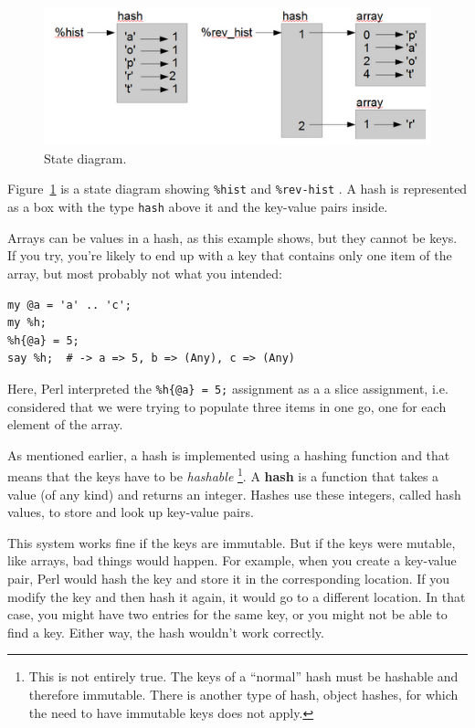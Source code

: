 \begin{figure}
\centerline
{\includegraphics[scale=0.8]{figs/hash1.png}}
\caption{State diagram.}
\label{fig.hash1}
\end{figure}

Figure~\ref{fig.hash1} is a state diagram showing \verb'%hist'  and \verb'%rev-hist' .
A hash is represented as a box with the type {\tt hash} above it
and the key-value pairs inside.

Arrays can be values in a hash, as this example shows, but they
cannot be keys.  If you try, you're likely to end up with a 
key that contains only one item of the array, but most probably 
not what you intended:

\begin{verbatim}
my @a = 'a' .. 'c';
my %h;
%h{@a} = 5;
say %h;  # -> a => 5, b => (Any), c => (Any)
\end{verbatim}

Here, Perl interpreted the \verb'%h{@a} = 5;' assignment 
as a a slice assignment, i.e. considered that we were 
trying to populate three items in one go, one for each 
element of the array.

As mentioned earlier, a hash is implemented using
a hashing function and that means that the keys have to 
be \emph{hashable} \footnote{This is not entirely true. The 
keys of a ``normal'' hash must be hashable and therefore 
immutable. There is another type of hash, object hashes, 
for which the need to have immutable keys does not apply.}. 
A {\bf hash} is a function that takes 
a value (of any kind) and returns an integer.  Hashes use 
these integers, called hash values, to store and look up 
key-value pairs.

This system works fine if the keys are immutable.  But if the
keys were mutable, like arrays, bad things would happen. For example,
when you create a key-value pair, Perl would hash the key and 
store it in the corresponding location.  If you modify the
key and then hash it again, it would go to a different location.
In that case, you might have two entries for the same key,
or you might not be able to find a key.  Either way, the
hash wouldn't work correctly.

